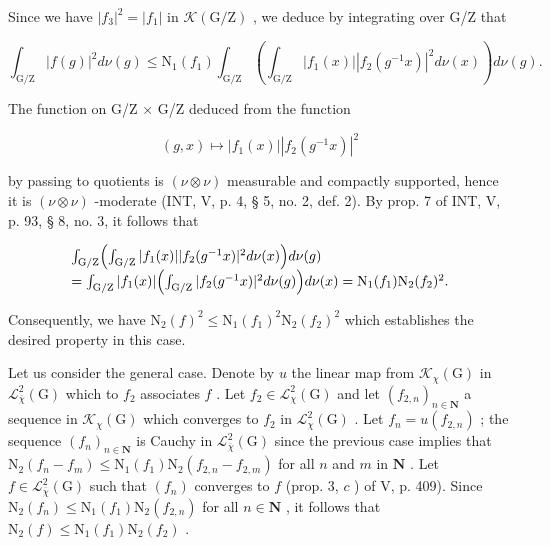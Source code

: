 Since we have \(|f_{3}|^{2}=|f_{1}|\) in \(\mathcal{K}(\mathrm{G}/\mathrm{Z})\) , we deduce by integrating over G/Z that

\[
\int_ {\mathrm{G} / \mathrm{Z}} | f (g) | ^ {2} d \nu (g) \leqslant \mathrm{N} _ {1} (f _ {1}) \int_ {\mathrm{G} / \mathrm{Z}} \left(\int_ {\mathrm{G} / \mathrm{Z}} | f _ {1} (x) | | f _ {2} (g ^ {- 1} x) | ^ {2} d \nu (x)\right) d \nu (g).
\]

The function on G/Z × G/Z deduced from the function

\[
(g, x) \mapsto | f _ {1} (x) | | f _ {2} (g ^ {- 1} x) | ^ {2}
\]

by passing to quotients is \((\nu \otimes \nu)\) measurable and compactly supported, hence it is \((\nu \otimes \nu)\) -moderate (INT, V, p. 4, § 5, no. 2, def. 2). By prop. 7 of INT, V, p. 93, § 8, no. 3, it follows that

\[
\begin{array}{l} \int_ {\mathrm{G} / \mathrm{Z}} \Bigl (\int_ {\mathrm{G} / \mathrm{Z}} | f _ {1} (x) |   | f _ {2} (g ^ {- 1} x) | ^ {2} d \nu (x) \Bigr) d \nu (g) \\ = \int_ {\mathrm{G} / \mathrm{Z}} | f _ {1} (x) | \Bigl (\int_ {\mathrm{G} / \mathrm{Z}} | f _ {2} (g ^ {- 1} x) | ^ {2} d \nu (g) \Bigr) d \nu (x) = \mathrm{N} _ {1} (f _ {1}) \mathrm{N} _ {2} (f _ {2}) ^ {2}. \end{array}
\]

Consequently, we have \(\mathrm{N}_{2}(f)^{2}\leqslant\mathrm{N}_{1}(f_{1})^{2}\mathrm{N}_{2}(f_{2})^{2}\) which establishes the desired property in this case.

 Let us consider the general case. Denote by \(u\) the linear map from \(\mathcal{K}_{\chi}(\mathrm{G})\) in \(\mathcal{L}_{\overline{\chi}}^{2}(\mathrm{G})\) which to \(f_{2}\) associates \(f\) . Let \(f_{2} \in \mathcal{L}_{\chi}^{2}(\mathrm{G})\) and let \((f_{2,n})_{n \in \mathbf{N}}\) a sequence in \(\mathcal{K}_{\chi}(\mathrm{G})\) which converges to \(f_{2}\) in \(\mathcal{L}_{\chi}^{2}(\mathrm{G})\) . Let \(f_{n} = u(f_{2,n})\) ; the sequence \((f_{n})_{n \in \mathbf{N}}\) is Cauchy in \(\mathcal{L}_{\overline{\chi}}^{2}(\mathrm{G})\) since the previous case implies that \(\mathrm{N}_{2}(f_{n} - f_{m}) \leqslant \mathrm{N}_{1}(f_{1})\mathrm{N}_{2}(f_{2,n} - f_{2,m})\) for all \(n\) and \(m\) in \(\mathbf{N}\) . Let \(f \in \mathcal{L}_{\overline{\chi}}^{2}(\mathrm{G})\) such that \((f_{n})\) converges to \(f\) (prop. 3, \(c\) ) of V, p. 409). Since \(\mathrm{N}_{2}(f_{n}) \leqslant \mathrm{N}_{1}(f_{1})\mathrm{N}_{2}(f_{2,n})\) for all \(n \in \mathbf{N}\) , it follows that \(\mathrm{N}_{2}(f) \leqslant \mathrm{N}_{1}(f_{1})\mathrm{N}_{2}(f_{2})\) .

